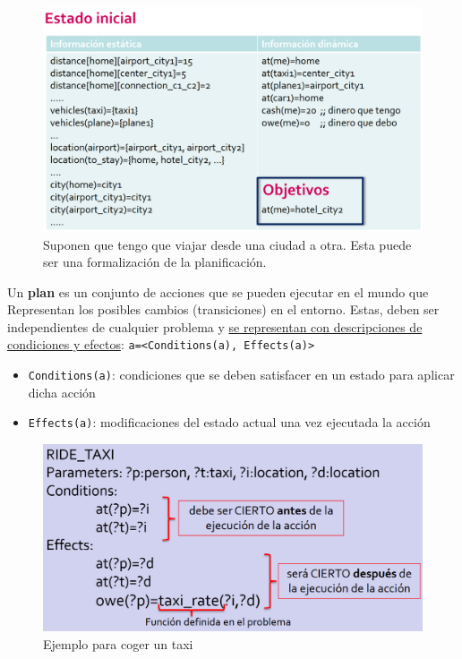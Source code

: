 \begin{figure}[htbp]
   \centering
   \includegraphics{images/02/estadoinicial.png}
   \caption{Suponen que tengo que viajar desde una ciudad a otra. Esta puede ser una formalización de la planificación.}
   \label{fig:02/estadoinicial}
\end{figure}


\begin{paracol}{2}
   
   Un \textbf{plan} es un conjunto de acciones que se pueden ejecutar en el mundo que Representan los posibles cambios (transiciones) en el entorno. Estas, deben ser independientes de cualquier problema y \ul{se representan con descripciones de condiciones y efectos}:
   \lstinline|a=<Conditions(a), Effects(a)>|
   \begin{itemize}
      \item \lstinline|Conditions(a)|: condiciones que se deben satisfacer en un
      estado para aplicar dicha acción
      \item \lstinline|Effects(a)|: modificaciones del estado actual una vez
      ejecutada la acción
   \end{itemize}

   \switchcolumn

   \begin{figure}[htbp]
      \centering
      \includegraphics{images/02/condiciones.png}
      \caption{Ejemplo para coger un taxi}
      \label{fig:02/condiciones}
   \end{figure}
\end{paracol}

